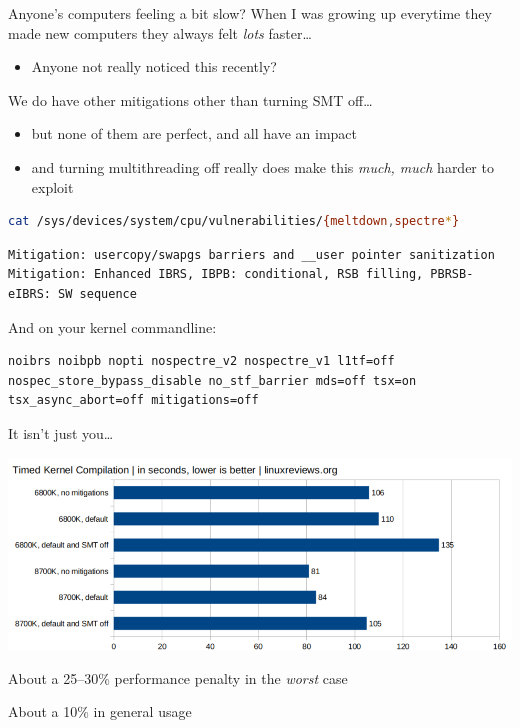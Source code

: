 \documentclass[9pt,aspectratio=169]{beamer}
\begin{document}
\begin{frame}[label={sec:org38f41ce},fragile]{Anyone's computers feeling a bit slow?}
 When I was growing up everytime they made new computers they always felt \emph{lots} faster\ldots{}
\begin{itemize}
\item Anyone not really noticed this recently?
\end{itemize}

We do have other mitigations other than turning SMT off\ldots{}
\begin{itemize}
\item but none of them are perfect, and all have an impact
\item and turning multithreading off really does make this \emph{much, much} harder to exploit
\end{itemize}

\begin{lstlisting}[language=sh,numbers=none]
cat /sys/devices/system/cpu/vulnerabilities/{meltdown,spectre*}
\end{lstlisting}

\begin{lstlisting}[language=text,numbers=none]
Mitigation: usercopy/swapgs barriers and __user pointer sanitization
Mitigation: Enhanced IBRS, IBPB: conditional, RSB filling, PBRSB-eIBRS: SW sequence
\end{lstlisting}

And on your kernel commandline:

\footnotesize\ttfamily
\begin{verbatim}
noibrs noibpb nopti nospectre_v2 nospectre_v1 l1tf=off
nospec_store_bypass_disable no_stf_barrier mds=off tsx=on
tsx_async_abort=off mitigations=off
\end{verbatim}
\end{frame}

\begin{frame}[label={sec:org6b51a88}]{It isn't just you\ldots{}}
\begin{center}
\includegraphics[width=\linewidth]{./performance.png}
\end{center}

About a 25--30\% performance penalty in the \emph{worst} case

About a 10\% in general usage
\end{frame}
\end{document}
